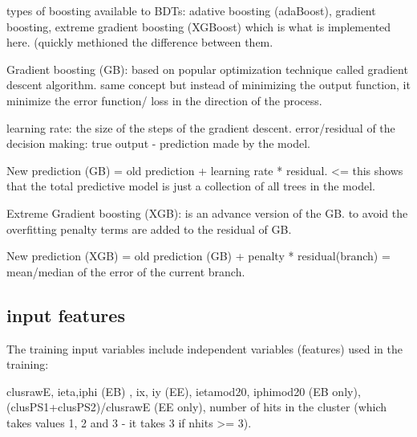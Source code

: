 types of boosting available to BDTs: adative boosting (adaBoost), gradient boosting, extreme gradient boosting (XGBoost) which is what is implemented here. 
(quickly methioned the difference between them.


Gradient boosting (GB): based on popular optimization technique called gradient descent algorithm.
same concept but instead of minimizing the output function, it minimize the error function/ loss in the direction of the process.

learning rate: the size of the steps of the gradient descent.
error/residual of the decision making: true output - prediction made by the model.

New prediction (GB)  = old prediction + learning rate * residual. <= this shows that the total predictive model is just a collection of all trees in the model.

Extreme Gradient boosting (XGB): is an advance version of the GB. to avoid the overfitting penalty terms are added to the residual of GB.

New prediction (XGB) = old prediction (GB) + penalty * residual(branch) = mean/median of the error of the current branch.



\subsection{input features}
The training input variables include independent variables (features) used in the training:

clusrawE,
ieta,iphi (EB) ,
ix, iy (EE),
ietamod20, iphimod20 (EB only),
(clusPS1+clusPS2)/clusrawE (EE only),
number of hits in the cluster (which takes values 1, 2 and 3 - it takes 3 if nhits >= 3).

